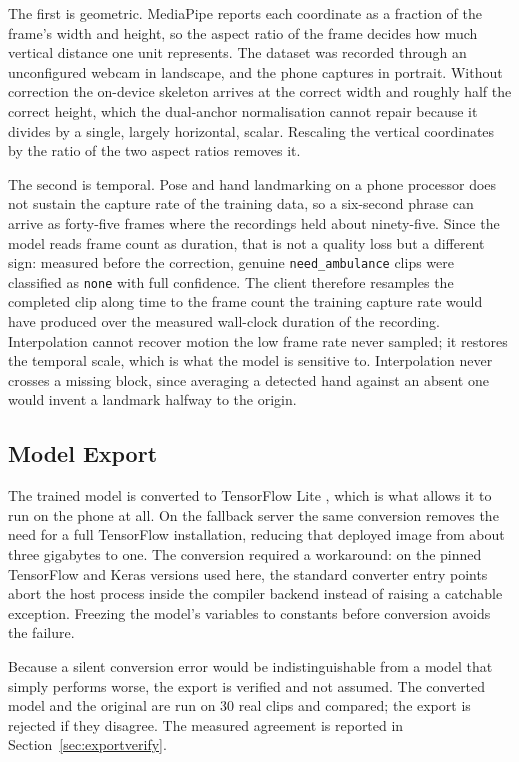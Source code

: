 The first is geometric. MediaPipe reports each coordinate as a fraction of the frame's width and height, so the aspect ratio of the frame decides how much vertical distance one unit represents. The dataset was recorded through an unconfigured webcam in landscape, and the phone captures in portrait. Without correction the on-device skeleton arrives at the correct width and roughly half the correct height, which the dual-anchor normalisation cannot repair because it divides by a single, largely horizontal, scalar. Rescaling the vertical coordinates by the ratio of the two aspect ratios removes it.

The second is temporal. Pose and hand landmarking on a phone processor does not sustain the capture rate of the training data, so a six-second phrase can arrive as forty-five frames where the recordings held about ninety-five. Since the model reads frame count as duration, that is not a quality loss but a different sign: measured before the correction, genuine \texttt{need\_ambulance} clips were classified as \texttt{none} with full confidence. The client therefore resamples the completed clip along time to the frame count the training capture rate would have produced over the measured wall-clock duration of the recording. Interpolation cannot recover motion the low frame rate never sampled; it restores the temporal scale, which is what the model is sensitive to. Interpolation never crosses a missing block, since averaging a detected hand against an absent one would invent a landmark halfway to the origin.

\subsection{Model Export}

The trained model is converted to TensorFlow Lite \cite{tflite2024}, which is what allows it to run on the phone at all. On the fallback server the same conversion removes the need for a full TensorFlow installation, reducing that deployed image from about three gigabytes to one. The conversion required a workaround: on the pinned TensorFlow and Keras versions used here, the standard converter entry points abort the host process inside the compiler backend instead of raising a catchable exception. Freezing the model's variables to constants before conversion avoids the failure.

Because a silent conversion error would be indistinguishable from a model that simply performs worse, the export is verified and not assumed. The converted model and the original are run on 30 real clips and compared; the export is rejected if they disagree. The measured agreement is reported in Section~\ref{sec:exportverify}.

